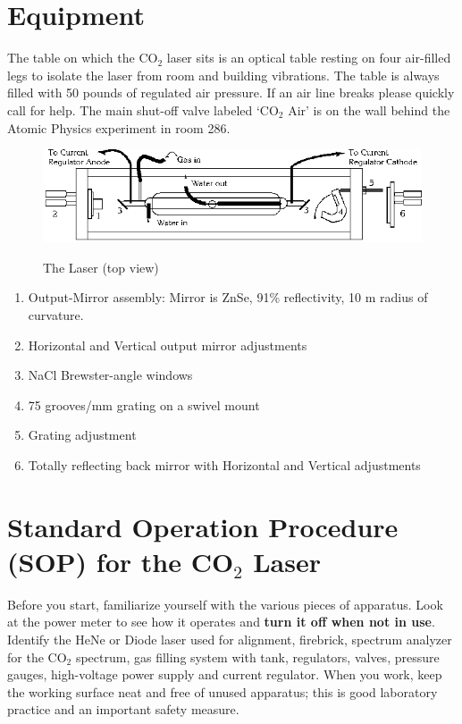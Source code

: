 \documentclass{../lab}
\begin{document}
\section{Equipment}

The table on which the CO$_2$ laser sits is an optical table resting on four air-filled legs to isolate the laser from room and building vibrations. The table is always filled with 50 pounds of regulated air pressure. If an air line breaks please quickly call for help. The main shut-off valve labeled `CO$_2$ Air' is on the wall behind the Atomic Physics experiment in room 286.

\begin{figure}[h]
    \centering
    \href{http://experimentationlab.berkeley.edu/sites/default/files/images/CO23.gif}{\includegraphics[width=0.7\linewidth]{images/CO23.png}}
    \caption{The Laser (top view)}
    \label{fig:TheLaserTopView}
\end{figure}

\begin{enumerate}
    \item Output-Mirror assembly: Mirror is ZnSe, 91\% reflectivity, 10 m radius of curvature.

    \item Horizontal and Vertical output mirror adjustments
    
    \item NaCl Brewster-angle windows
    
    \item 75 grooves/mm grating on a swivel mount
    
    \item Grating adjustment
    
    \item Totally reflecting back mirror with Horizontal and Vertical adjustments
\end{enumerate}

\section{Standard Operation Procedure (SOP) for the CO\texorpdfstring{$_2$}{2} Laser}

Before you start, familiarize yourself with the various pieces of apparatus. Look at the power meter to see how it operates and \textbf{turn it off when not in use}. Identify the HeNe or Diode laser used for alignment, firebrick, spectrum analyzer for the CO$_2$ spectrum, gas filling system with tank, regulators, valves, pressure gauges, high-voltage power supply and current regulator. When you work, keep the working surface neat and free of unused apparatus; this is good laboratory practice and an important safety measure.
\end{document}
